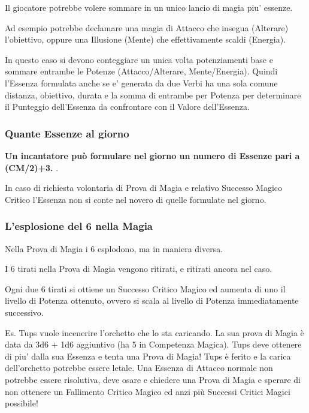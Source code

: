 \documentclass[a4paper,twoside,openany]{book}
\begin{document}
\begin{multicols}{2}
Il giocatore potrebbe volere sommare in un unico lancio di magia piu' essenze.

Ad esempio potrebbe declamare una magia di Attacco che insegua (Alterare) l'obiettivo, oppure una Illusione (Mente) che effettivamente scaldi (Energia).

In questo caso si devono conteggiare un unica volta potenziamenti base e sommare entrambe le Potenze (Attacco/Alterare, Mente/Energia). Quindi l'Essenza formulata anche se e' generata da due Verbi ha una sola comune distanza, obiettivo, durata e la somma di entrambe per Potenza per determinare il Punteggio dell'Essenza da confrontare con il Valore dell'Essenza.

\subsubsection{Quante Essenze al giorno}


\textbf{Un incantatore può formulare nel giorno un numero di Essenze pari a (CM/2)+3.} .

In caso di richiesta volontaria di Prova di Magia e relativo Successo Magico Critico l'Essenza  non si conte nel novero di quelle formulate nel giorno.

\subsubsection{L'esplosione del 6 nella Magia}

\label{lesplosione-del-6-nella-magia}

Nella Prova di Magia i 6 esplodono, ma in maniera diversa.

I 6 tirati nella Prova di Magia vengono ritirati, e ritirati ancora nel caso.

Ogni due 6 tirati si ottiene un Successo Critico Magico ed aumenta di uno il livello di Potenza ottenuto, ovvero si scala al livello di Potenza immediatamente successivo.

Es. Tups vuole incenerire l'orchetto che lo sta caricando. La sua prova di Magia è data da 3d6 + 1d6 aggiuntivo (ha 5 in Competenza Magica). Tups deve ottenere di piu' dalla sua Essenza e tenta una Prova di Magia!
Tups è ferito e la carica dell'orchetto potrebbe essere letale. Una Essenza di Attacco normale non potrebbe essere risolutiva, deve osare e chiedere una Prova di Magia e sperare di non ottenere un Fallimento Critico Magico ed anzi più Successi Critici Magici possibile!


\end{multicols}
\end{document}
